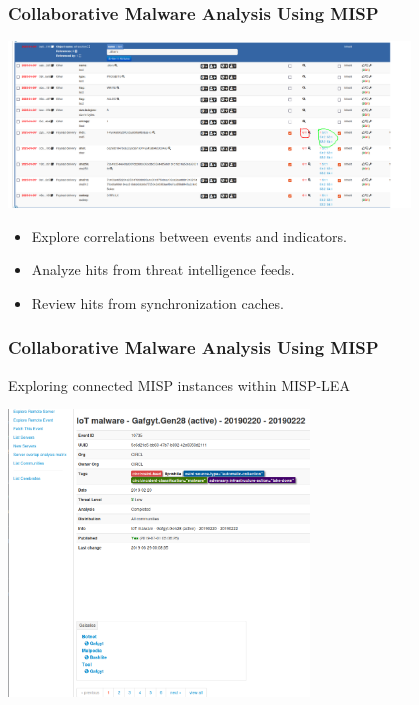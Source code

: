 \begin{frame}
\frametitle{Collaborative Malware Analysis Using MISP}

\centering
\includegraphics[width=0.8\textwidth]{img/correlation2.png}

\begin{itemize}
    \item Explore correlations between events and indicators.
    \item Analyze hits from threat intelligence feeds.
    \item Review hits from synchronization caches.
\end{itemize}

\end{frame}

\begin{frame}
\frametitle{Collaborative Malware Analysis Using MISP}

Exploring connected MISP instances within MISP-LEA

\centering
\includegraphics[width=0.6\textwidth]{img/foreign.png}

\end{frame}

